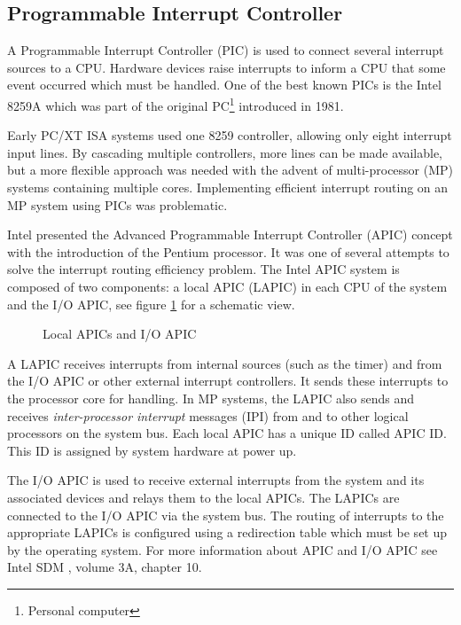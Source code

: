 \subsection{Programmable Interrupt Controller}\label{subsec:apic}
A Programmable Interrupt Controller (PIC) is used to connect several
interrupt sources to a CPU. Hardware devices raise interrupts to inform a CPU
that some event occurred which must be handled. One of the best known PICs is
the Intel 8259A which was part of the original PC\footnote{Personal
computer} introduced in 1981.

Early PC/XT ISA systems used one 8259 controller, allowing only
eight interrupt input lines. By cascading multiple controllers, more lines can
be made available, but a more flexible approach was needed with the advent of
multi-processor (MP) systems containing multiple cores. Implementing
efficient interrupt routing on an MP system using PICs was problematic.

Intel presented the Advanced Programmable Interrupt Controller
(APIC) concept with the introduction of the Pentium processor. It
was one of several attempts to solve the interrupt routing efficiency problem.
The Intel APIC system is composed of two components: a local APIC
(LAPIC) in each CPU of the system and the I/O APIC,
see figure \ref{fig:apic} for a schematic view.

\begin{figure}[h]
	\centering
	
	\caption{Local APICs and I/O APIC}
	\label{fig:apic}
\end{figure}

A LAPIC receives interrupts from internal sources (such as the timer) and from
the I/O APIC or other external interrupt controllers. It sends these interrupts
to the processor core for handling. In MP systems, the LAPIC also sends and
receives \emph{inter-processor interrupt} messages (IPI) from and to
other logical processors on the system bus. Each local APIC has a unique ID
called APIC ID. This ID is assigned by system hardware at power
up.

The I/O APIC is used to receive external interrupts from the system and its
associated devices and relays them to the local APICs. The LAPICs are connected
to the I/O APIC via the system bus. The routing of interrupts to the appropriate
LAPICs is configured using a redirection table which must be set up by the
operating system. For more information about APIC and I/O APIC see Intel SDM
\cite{IntelSDM}, volume 3A, chapter 10.

